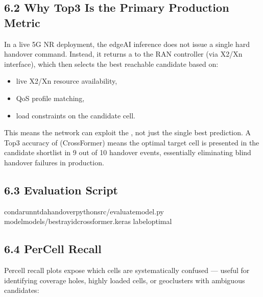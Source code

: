 \documentclass[letterpaper,10pt,english]{sphinxmanual}
\begin{document}
\subsection{6.2 Why Top\sphinxhyphen{}3 Is the Primary Production Metric}
\label{\detokenize{training:why-top-3-is-the-primary-production-metric}}
\sphinxAtStartPar
In a live 5G NR deployment, the edge\sphinxhyphen{}AI inference does not issue a single hard handover command. Instead, it returns a  to the RAN controller (via X2/Xn interface), which then selects the best reachable candidate based on:
\begin{itemize}
\item {} 
\sphinxAtStartPar
live X2/Xn resource availability,

\item {} 
\sphinxAtStartPar
QoS profile matching,

\item {} 
\sphinxAtStartPar
load constraints on the candidate cell.

\end{itemize}

\sphinxAtStartPar
This means the network can exploit the , not just the single best prediction. A Top\sphinxhyphen{}3 accuracy of  (CrossFormer) means the optimal target cell is presented in the candidate shortlist in 9 out of 10 handover events, essentially eliminating blind handover failures in production.


\subsection{6.3 Evaluation Script}
\label{\detokenize{training:evaluation-script}}
\begin{sphinxVerbatim}[commandchars=\\\{\}]
condarun\PYGZhy{}ntda\PYGZhy{}handoverpythonsrc/evaluate\PYGZus{}model.py
\PYGZhy{}\PYGZhy{}modelmodels/best\PYGZus{}ray\PYGZus{}id\PYGZus{}crossformer.keras
\PYGZhy{}\PYGZhy{}labeloptimal
\end{sphinxVerbatim}


\subsection{6.4 Per\sphinxhyphen{}Cell Recall}
\label{\detokenize{training:per-cell-recall}}
\sphinxAtStartPar
Per\sphinxhyphen{}cell recall plots expose which cells are systematically confused — useful for identifying coverage holes, highly loaded cells, or geo\sphinxhyphen{}clusters with ambiguous candidates:
\end{document}
